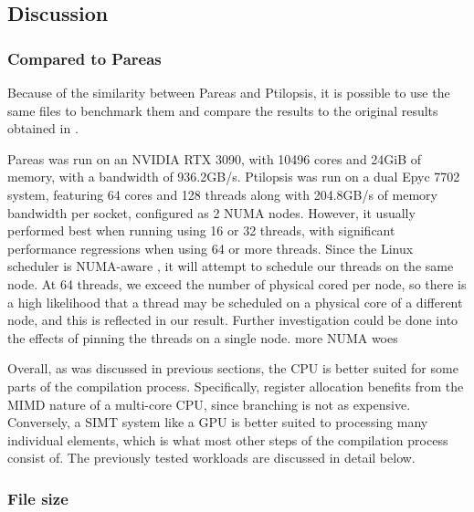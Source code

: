 \documentclass[11pt,dvipsnames]{article}
\newcommand{\helpme}[1]{{\color{red}#1}}
\begin{document}
\subsection{Discussion} \label{discussion}
\subsubsection{Compared to Pareas}

Because of the similarity between Pareas and Ptilopsis, it is possible to use the same files to benchmark them and compare the results to the original results obtained in \cite{huijben2021}.

Pareas was run on an NVIDIA RTX 3090, with 10496 cores and 24GiB of memory, with a bandwidth of 936.2GB/s. Ptilopsis was run on a dual Epyc 7702 system, featuring 64 cores and 128 threads along with 204.8GB/s of memory bandwidth per socket, configured as 2 NUMA nodes. However, it usually performed best when running using 16 or 32 threads, with significant performance regressions when using 64 or more threads. Since the Linux scheduler is NUMA-aware \cite{kernelnuma}, it will attempt to schedule our threads on the same node. At 64 threads, we exceed the number of physical cored per node, so there is a high likelihood that a thread may be scheduled on a physical core of a different node, and this is reflected in our result. Further investigation could be done into the effects of pinning the threads on a single node.
\helpme{more NUMA woes}

Overall, as was discussed in previous sections, the CPU is better suited for some parts of the compilation process. Specifically, register allocation benefits from the MIMD nature of a multi-core CPU, since branching is not as expensive. Conversely, a SIMT system like a GPU is better suited to processing many individual elements, which is what most other steps of the compilation process consist of. The previously tested workloads are discussed in detail below.

\subsubsection*{File size}
\end{document}
